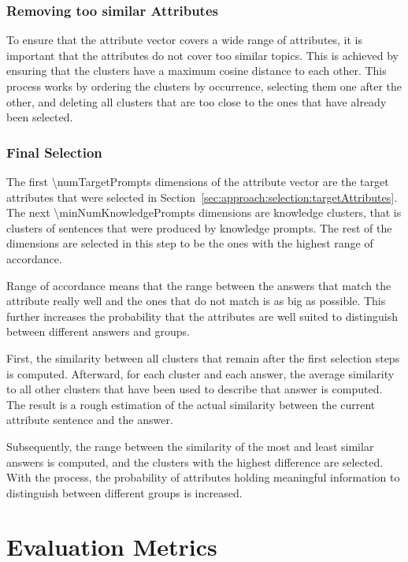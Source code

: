 \subsubsection{Removing too similar Attributes}
\label{sec:experiments_evaluation:selection:removeSimilar}
To ensure that the attribute vector covers a wide range of attributes, it is important that the attributes do not cover too similar topics. This is achieved by ensuring that the clusters have a maximum cosine distance to each other. This process works by ordering the clusters by occurrence, selecting them one after the other, and deleting all clusters that are too close to the ones that have already been selected.

\subsubsection{Final Selection} %
\label{sec:experiments_evaluation:selection:finalSelection}
The first \num{\numTargetPrompts} dimensions of the attribute vector are the target attributes that were selected in Section~\ref{sec:approach:selection:targetAttributes}. The next \num{\minNumKnowledgePrompts} dimensions are knowledge clusters, that is clusters of sentences that were produced by knowledge prompts. The rest of the dimensions are selected in this step to be the ones with the highest range of accordance. %

Range of accordance means that the range between the answers that match the attribute really well and the ones that do not match is as big as possible. This further increases the probability that the attributes are well suited to distinguish between different answers and groups.

First, the similarity between all clusters that remain after the first selection steps is computed. Afterward, for each cluster and each answer, the average similarity to all other clusters that have been used to describe that answer is computed. The result is a rough estimation of the actual similarity between the current attribute sentence and the answer.

Subsequently, the range between the similarity of the most and least similar answers is computed, and the clusters with the highest difference are selected. With the process, the probability of attributes holding meaningful information to distinguish between different groups is increased.



\section{Evaluation Metrics}
\label{sec:experiments_evaluation:evaluationMetrics}

